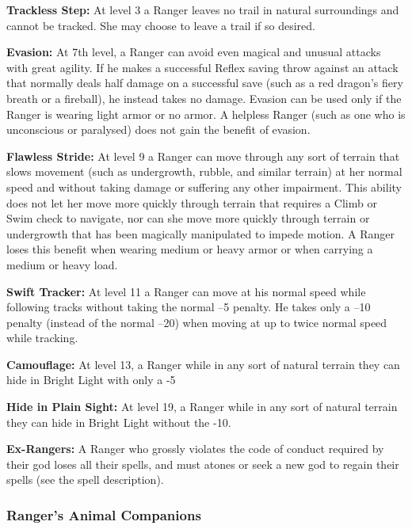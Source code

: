 \textbf{Trackless Step:} At level 3 a Ranger leaves no trail in natural surroundings and cannot be tracked. She may choose to leave a trail if so desired.

\textbf{Evasion:} At 7th level, a Ranger can avoid even magical and unusual attacks with great agility. If he makes a successful Reflex saving throw against an attack that normally deals half damage on a successful save (such as a red dragon’s fiery breath or a fireball), he instead takes no damage. Evasion can be used only if the Ranger is wearing light armor or no armor. A helpless Ranger (such as one who is unconscious or paralysed) does not gain the benefit of evasion.

\textbf{Flawless Stride:} At level 9 a Ranger can move through any sort of terrain that slows movement (such as undergrowth, rubble, and similar terrain) at her normal speed and without taking damage or suffering any other impairment.
This ability does not let her move more quickly through terrain that requires a Climb or Swim check to navigate, nor can she move more quickly through terrain or undergrowth that has been magically manipulated to impede motion.
A Ranger loses this benefit when wearing medium or heavy armor or when carrying a medium or heavy load.

\textbf{Swift Tracker:} At level 11 a Ranger can move at his normal speed while following tracks without taking the normal –5 penalty. He takes only a –10 penalty (instead of the normal –20) when moving at up to twice normal speed while tracking.

\textbf{Camouflage:} At level 13, a Ranger while in any sort of natural terrain they can hide in Bright Light with only a -5

\textbf{Hide in Plain Sight:} At level 19, a Ranger while in any sort of natural terrain they can hide in Bright Light without the -10.

\textbf{Ex-Rangers:} A Ranger who grossly violates the code of conduct required by their god loses all their spells, and must atones or seek a new god to regain their spells (see the  spell description).

\subsubsection{Ranger's Animal Companions}

